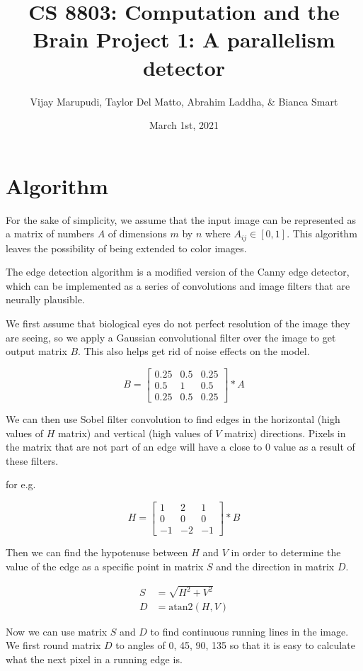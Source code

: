 \documentclass{article}
\title{CS 8803: Computation and the Brain Project 1: A parallelism detector}
\author{Vijay Marupudi, Taylor Del Matto, Abrahim Laddha, \& Bianca Smart}
\date{March 1st, 2021}
\begin{document}
\maketitle

\section{Algorithm}

For the sake of simplicity, we assume that the input image can be represented
as a matrix of numbers $A$ of dimensions $m$ by $n$ where $A_{ij} \in [0, 1]$. This algorithm leaves the possibility of being extended to color images.

The edge detection algorithm is a modified version of the Canny edge detector, which can be implemented as a series of convolutions and image filters that are neurally plausible.

We first assume that biological eyes do not perfect resolution of the image
they are seeing, so we apply a Gaussian convolutional filter over the image to
get output matrix $B$. This also helps get rid of noise effects on the model.

$$B = \begin{bmatrix}
  0.25 & 0.5 &  0.25 \\
  0.5 & 1 & 0.5 \\
  0.25 & 0.5 & 0.25
\end{bmatrix} * A$$

We can then use Sobel filter convolution to find edges in the horizontal (high values of $H$ matrix) and vertical (high values of $V$ matrix) directions. Pixels in the matrix that are not part of an edge will have a close to 0 value as a result of these filters.

for e.g. 

\[
H = \begin{bmatrix}
  1 & 2 & 1 \\
  0 & 0 & 0 \\
  -1 & -2 & -1
\end{bmatrix} * B
\]

Then we can find the hypotenuse between $H$ and $V$ in order to determine the value of the edge as a specific point in matrix $S$ and the direction in matrix $D$.

\begin{align*}
  S &= \sqrt{H^2 + V^2} \\
  D &= \text{atan2}(H, V)
\end{align*}

Now we can use matrix $S$ and $D$ to find continuous running lines in the image. We first round matrix $D$ to angles of 0, 45, 90, 135 so that it is easy to calculate what the next pixel in a running edge is.
\end{document}
